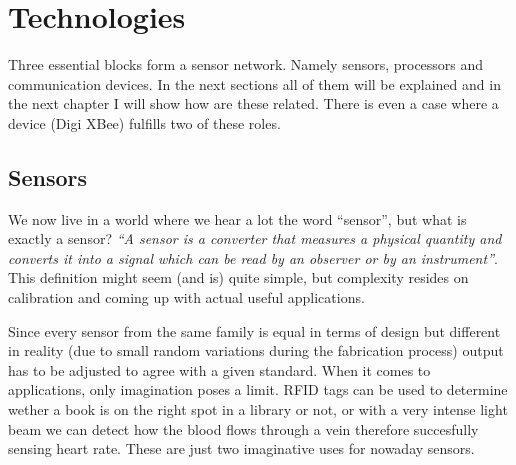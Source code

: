 
\chapter{Technologies} %

\label{Chapter3} %




Three essential blocks form a sensor network. Namely sensors, processors and communication devices\citep{chong2003sensor}. In the next sections all of them will be explained and in the next chapter I will show how are these related. There is even a case where a device (Digi XBee\textregistered) fulfills two of these roles.



\section{Sensors}

We now live in a world where we hear a lot the word ``sensor'', but what is exactly a sensor? \emph{``A sensor is a converter that measures a physical quantity and converts it into a signal which can be read by an observer or by an instrument''}\citep{WikiSensor}. This definition might seem (and is) quite simple, but complexity resides on calibration and coming up with actual useful applications. 

Since every sensor from the same family is equal in terms of design but different in reality (due to small random variations during the fabrication process) output has to be adjusted to agree with a given standard. When it comes to applications, only imagination poses a limit. RFID tags can be used to determine wether a book is on the right spot in a library or not, or with a very intense light beam we can detect how the blood flows through a vein therefore succesfully sensing heart rate. These are just two imaginative uses for nowaday sensors.

